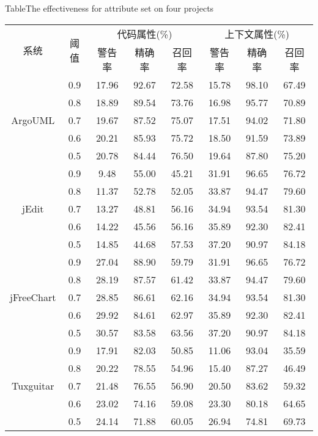 \begin{table}[htbp]
{Table$\!$}{The effectiveness for attribute set on four projects}
\vspace{0.5em}\centering\wuhao
\begin{tabular}{cccccccc}
\toprule[1.5pt]
\multirow{2}{*}{系统}&\multirow{2}{*}{阈值}&\multicolumn{3}{c}{ 代码属性(\%)}&\multicolumn{3}{c}{上下文属性(\%)}\\
\cline{3-8}
&&{警告率}&{精确率}&{召回率}&{警告率}&{精确率}&{召回率}\\
\midrule[1pt]
\multirow{5}{*}{ArgoUML}
&0.9&	17.96&	92.67&	72.58&	15.78&	98.10&	67.49\\
&0.8&	18.89&	89.54&	73.76&	16.98&	95.77&	70.89\\
&0.7&	19.67&	87.52&	75.07&	17.51&	94.02&	71.80\\
&0.6&	20.21&	85.93&	75.72&	18.50&	91.59&	73.89\\
&0.5&	20.78&	84.44&	76.50&	19.64&	87.80&	75.20\\
\hline
\multirow{5}{*}{jEdit}
&0.9&	9.48&	55.00&	45.21&	31.91&	96.65&	76.72\\
&0.8&	11.37&	52.78&	52.05&	33.87&	94.47&	79.60\\
&0.7&	13.27&	48.81&	56.16&	34.94&	93.54&	81.30\\
&0.6&	14.22&	45.56&	56.16&	35.89&	92.30&	82.41\\
&0.5&	14.85&	44.68&	57.53&	37.20&	90.97&	84.18\\
\hline
\multirow{5}{*}{jFreeChart}
&0.9&	27.04&	88.90&	59.79&	31.91&	96.65&	76.72\\
&0.8&	28.19&	87.57&	61.42&	33.87&	94.47&	79.60\\
&0.7&	28.85&	86.61&	62.16&	34.94&	93.54&	81.30\\
&0.6&	29.92&	84.61&	62.97&	35.89&	92.30&	82.41\\
&0.5&	30.57&	83.58&	63.56&	37.20&	90.97&	84.18\\
\hline
\multirow{5}{*}{Tuxguitar}
&0.9&	17.91&	82.03&	50.85&	11.06&	93.04&	35.59\\
&0.8&	20.22&	78.55&	54.96&	15.40&	87.27&	46.49\\
&0.7&	21.48&	76.55&	56.90&	20.50&	83.62&	59.32\\
&0.6&	23.02&	74.16&	59.08&	23.30&	80.18&	64.65\\
&0.5&	24.14&	71.88&	60.05&	26.94&	74.81&	69.73\\
\bottomrule[1.5pt]
\end{tabular}
\end{table}

